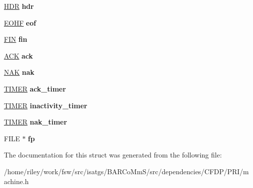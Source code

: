 \begin{DoxyCompactItemize}
\item 
\hyperlink{struct_h_d_r}{H\+DR} {\bfseries hdr}\hypertarget{struct_m_a_c_h_i_n_e_abfab47e12f6dde6e337a40e626e69344}{}\label{struct_m_a_c_h_i_n_e_abfab47e12f6dde6e337a40e626e69344}

\item 
\hyperlink{struct_e_o_h_f}{E\+O\+HF} {\bfseries eof}\hypertarget{struct_m_a_c_h_i_n_e_a10896a7f7589f9a9d07fe736fc7dbfe9}{}\label{struct_m_a_c_h_i_n_e_a10896a7f7589f9a9d07fe736fc7dbfe9}

\item 
\hyperlink{struct_f_i_n}{F\+IN} {\bfseries fin}\hypertarget{struct_m_a_c_h_i_n_e_a53699b59fdc5c35fd9c65b9be8595891}{}\label{struct_m_a_c_h_i_n_e_a53699b59fdc5c35fd9c65b9be8595891}

\item 
\hyperlink{struct_a_c_k}{A\+CK} {\bfseries ack}\hypertarget{struct_m_a_c_h_i_n_e_aeb46efb7b2b8a9ba78cae575666fe5ba}{}\label{struct_m_a_c_h_i_n_e_aeb46efb7b2b8a9ba78cae575666fe5ba}

\item 
\hyperlink{struct_n_a_k}{N\+AK} {\bfseries nak}\hypertarget{struct_m_a_c_h_i_n_e_a1f554312ebb28922a00c92a194cdfbcc}{}\label{struct_m_a_c_h_i_n_e_a1f554312ebb28922a00c92a194cdfbcc}

\item 
\hyperlink{struct_t_i_m_e_r}{T\+I\+M\+ER} {\bfseries ack\+\_\+timer}\hypertarget{struct_m_a_c_h_i_n_e_a2becfb37bd030c6c5831f73f17f59096}{}\label{struct_m_a_c_h_i_n_e_a2becfb37bd030c6c5831f73f17f59096}

\item 
\hyperlink{struct_t_i_m_e_r}{T\+I\+M\+ER} {\bfseries inactivity\+\_\+timer}\hypertarget{struct_m_a_c_h_i_n_e_aa90e121947901483be899bd6a160d577}{}\label{struct_m_a_c_h_i_n_e_aa90e121947901483be899bd6a160d577}

\item 
\hyperlink{struct_t_i_m_e_r}{T\+I\+M\+ER} {\bfseries nak\+\_\+timer}\hypertarget{struct_m_a_c_h_i_n_e_a71d4fea80d390eeb5aa124caca9f006b}{}\label{struct_m_a_c_h_i_n_e_a71d4fea80d390eeb5aa124caca9f006b}

\item 
F\+I\+LE $\ast$ {\bfseries fp}\hypertarget{struct_m_a_c_h_i_n_e_a0892fd0c53969ae7acdf590bc2e4a2be}{}\label{struct_m_a_c_h_i_n_e_a0892fd0c53969ae7acdf590bc2e4a2be}

\end{DoxyCompactItemize}


The documentation for this struct was generated from the following file\+:\begin{DoxyCompactItemize}
\item 
/home/riley/work/fsw/src/isatgs/\+B\+A\+R\+Co\+Mm\+S/src/dependencies/\+C\+F\+D\+P/\+P\+R\+I/machine.\+h\end{DoxyCompactItemize}
